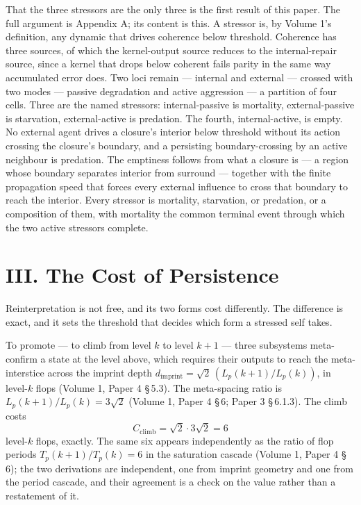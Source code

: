 \documentclass[11pt,oneside]{report}
\theoremstyle{definition}
\theoremstyle{remark}
\begin{document}
That the three stressors are the only three is the first result of this paper. The full argument is Appendix A; its content is this. A stressor is, by Volume 1's definition, any dynamic that drives coherence below threshold. Coherence has three sources, of which the kernel-output source reduces to the internal-repair source, since a kernel that drops below coherent fails parity in the same way accumulated error does. Two loci remain --- internal and external --- crossed with two modes --- passive degradation and active aggression --- a partition of four cells. Three are the named stressors: internal-passive is mortality, external-passive is starvation, external-active is predation. The fourth, internal-active, is empty. No external agent drives a closure's interior below threshold without its action crossing the closure's boundary, and a persisting boundary-crossing by an active neighbour is predation. The emptiness follows from what a closure is --- a region whose boundary separates interior from surround --- together with the finite propagation speed that forces every external influence to cross that boundary to reach the interior. Every stressor is mortality, starvation, or predation, or a composition of them, with mortality the common terminal event through which the two active stressors complete.

\section*{III. The Cost of Persistence}

Reinterpretation is not free, and its two forms cost differently. The difference is exact, and it sets the threshold that decides which form a stressed self takes.

To promote --- to climb from level \ensuremath{k} to level \ensuremath{k+1} --- three subsystems meta-confirm a state at the level above, which requires their outputs to reach the meta-interstice across the imprint depth \ensuremath{d_{\mathrm{imprint}} = \sqrt{2}\,(L_p(k{+}1)/L_p(k))}, in level-\ensuremath{k} flops (Volume 1, Paper 4 \S\,5.3). The meta-spacing ratio is \ensuremath{L_p(k{+}1)/L_p(k) = 3\sqrt{2}} (Volume 1, Paper 4 \S\,6; Paper 3 \S\,6.1.3). The climb costs
\[
C_{\mathrm{climb}} = \sqrt{2}\cdot 3\sqrt{2} = 6
\]
level-\ensuremath{k} flops, exactly. The same six appears independently as the ratio of flop periods \ensuremath{T_p(k{+}1)/T_p(k) = 6} in the saturation cascade (Volume 1, Paper 4 \S\,6); the two derivations are independent, one from imprint geometry and one from the period cascade, and their agreement is a check on the value rather than a restatement of it.
\end{document}
